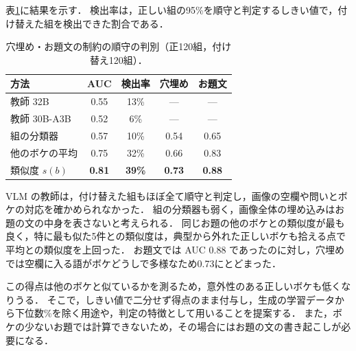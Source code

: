 表\ref{tab_compliance}に結果を示す．
検出率は，正しい組の95\%を順守と判定するしきい値で，付け替えた組を検出できた割合である．

\begin{table}[t]
    \centering
    \caption{穴埋め・お題文の制約の順守の判別（正120組，付け替え120組）．}
    \label{tab_compliance}
    \small
    \begin{tabular}{lcccc}
        \toprule
        方法 & AUC & 検出率 & 穴埋め & お題文 \\
        \midrule
        教師 32B & 0.55 & 13\% & --- & --- \\
        教師 30B-A3B & 0.52 & 6\% & --- & --- \\
        組の分類器 & 0.57 & 10\% & 0.54 & 0.65 \\
        他のボケの平均 & 0.75 & 32\% & 0.66 & 0.83 \\
        類似度 $ s(b) $ & \textbf{0.81} & \textbf{39\%} & \textbf{0.73} & \textbf{0.88} \\
        \bottomrule
    \end{tabular}
\end{table}

VLM の教師は，付け替えた組もほぼ全て順守と判定し，画像の空欄や問いとボケの対応を確かめられなかった．
組の分類器も弱く，画像全体の埋め込みはお題の文の中身を表さないと考えられる．
同じお題の他のボケとの類似度が最も良く，特に最も似た5件との類似度は，典型から外れた正しいボケも拾える点で平均との類似度を上回った．
お題文では AUC 0.88 であったのに対し，穴埋めでは空欄に入る語がボケどうしで多様なため0.73にとどまった．

この得点は他のボケと似ているかを測るため，意外性のある正しいボケも低くなりうる．
そこで，しきい値で二分せず得点のまま付与し，生成の学習データから下位数\%を除く用途や，判定の特徴として用いることを提案する．
また，ボケの少ないお題では計算できないため，その場合にはお題の文の書き起こしが必要になる．

